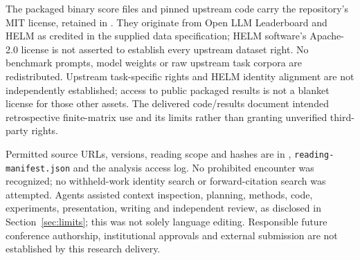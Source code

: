 \documentclass{article}
\begin{document}
The packaged binary score files and pinned upstream code carry the repository's MIT license, retained in . They originate from Open LLM Leaderboard and HELM as credited in the supplied data specification; HELM software's Apache-2.0 license is not asserted to establish every upstream dataset right. No benchmark prompts, model weights or raw upstream task corpora are redistributed. Upstream task-specific rights and HELM identity alignment are not independently established; access to public packaged results is not a blanket license for those other assets. The delivered code/results document intended retrospective finite-matrix use and its limits rather than granting unverified third-party rights.

Permitted source URLs, versions, reading scope and hashes are in , \texttt{reading-manifest.json} and the analysis access log. No prohibited encounter was recognized; no withheld-work identity search or forward-citation search was attempted. Agents assisted context inspection, planning, methods, code, experiments, presentation, writing and independent review, as disclosed in Section~\ref{sec:limits}; this was not solely language editing. Responsible future conference authorship, institutional approvals and external submission are not established by this research delivery.
\clearpage

\clearpage

\end{document}
